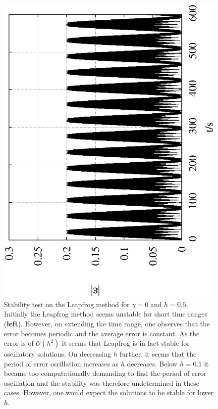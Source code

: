 \documentclass[10pt,a4paper]{article}
\begin{document}
\begin{figure}[h!]
\begin{center}
\includegraphics[scale = 0.3, angle =-90]{./Leapfrog_0.5_100000_0.txt.eps}
\caption{Stability test on the Leapfrog method for $\gamma = 0$ and $h=0.5$. Initially the Leapfrog method seems unstable for short time ranges (\textbf{left}). However, on extending the time range, one observes that the error becomes periodic and the average error is constant. As the error is of $\mathcal{O}(h^2)$ it seems that Leapfrog is in fact stable for oscillatory solutions. On decreasing $h$ further, it seems that the period of error oscillation increases as $h$ decreases. Below $h=0.1$ it became too computationally demanding to find the period of error oscillation and the stability was therefore undetermined in these cases. However, one would expect the solutions to be stable for lower $h$.}
\label{fig:LeapStabilityUndamped}
\end{center}
\end{figure}
\end{document}
